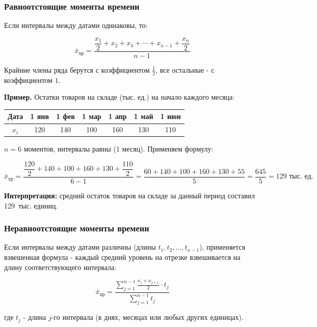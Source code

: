 \documentclass[a4paper]{article}
\begin{document}
\subsubsection{Равноотстоящие моменты времени}

Если интервалы между датами одинаковы, то:

\begin{equation}
	\bar{x}_{\text{хр}} =
	\frac{\dfrac{x_1}{2} + x_2 + x_3 + \cdots + x_{n-1} + \dfrac{x_n}{2}}{n - 1}
\end{equation}

Крайние члены ряда берутся с коэффициентом $\tfrac{1}{2}$, все остальные - с
коэффициентом $1$.


	\textbf{Пример.} Остатки товаров на складе (тыс. ед.) на начало каждого месяца:
	
	\begin{center}
		\begin{tabular}{ccccccc}
			\toprule
			Дата & 1 янв & 1 фев & 1 мар & 1 апр & 1 май & 1 июн \\
			\midrule
			$x_i$ & 120 & 140 & 100 & 160 & 130 & 110 \\
			\bottomrule
		\end{tabular}
	\end{center}
	
	$n = 6$ моментов, интервалы равны (1 месяц). Применяем формулу:
	
	\[
	\bar{x}_{\text{хр}}
	= \frac{\dfrac{120}{2} + 140 + 100 + 160 + 130 + \dfrac{110}{2}}{6 - 1}
	= \frac{60 + 140 + 100 + 160 + 130 + 55}{5}
	= \frac{645}{5} = 129 \text{ тыс. ед.}
	\]
	
	\textbf{Интерпретация:} средний остаток товаров на складе за данный период
	составил 129~тыс. единиц.


\subsubsection{Неравноотстоящие моменты времени}

Если интервалы между датами различны (длины $t_1, t_2, \ldots, t_{n-1}$),
применяется взвешенная формула - каждый средний уровень на отрезке
взвешивается на длину соответствующего интервала:

\begin{equation}
	\bar{x}_{\text{хр}} =
	\frac{\displaystyle\sum_{j=1}^{n-1} \frac{x_j + x_{j+1}}{2} \cdot t_j}
	{\displaystyle\sum_{j=1}^{n-1} t_j}
\end{equation}

где $t_j$ - длина $j$-го интервала (в днях, месяцах или любых других единицах).
\end{document}
